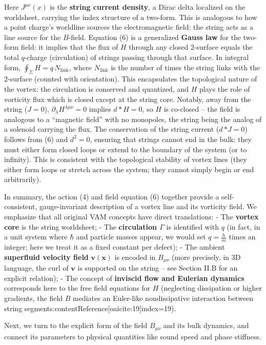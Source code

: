 \documentclass[12pt]{article}
\begin{document}
Here $J^{\mu\nu}(x)$ is the \textbf{string current density}, a Dirac delta localized on the worldsheet, carrying the index structure of a two-form. This is analogous to how a point charge’s worldline sources the electromagnetic field: the string acts as a line source for the $B$-field. Equation (6) is a generalized \textbf{Gauss law} for the two-form field: it implies that the flux of $H$ through any closed 2-surface equals the total $q$-charge (circulation) of strings passing through that surface. In integral form, $\oint_{\Sigma} H = q \,N_{\text{link}}$, where $N_{\text{link}}$ is the number of times the string links with the 2-surface (counted with orientation). This encapsulates the topological nature of the vortex: the circulation is conserved and quantized, and $H$ plays the role of vorticity flux which is closed except at the string core. Notably, away from the string ($J=0$), $\partial_\lambda H^{\lambda\mu\nu}=0$ implies $d*H=0$, so $H$ is co-closed – the field is analogous to a “magnetic field” with no monopoles, the string being the analog of a solenoid carrying the flux. The conservation of the string current ($d\,{*J}=0$) follows from (6) and $d^2=0$, ensuring that strings cannot end in the bulk: they must either form closed loops or extend to the boundary of the system (or to infinity). This is consistent with the topological stability of vortex lines (they either form loops or stretch across the system; they cannot simply begin or end arbitrarily).

In summary, the action (4) and field equation (6) together provide a self-consistent, gauge-invariant description of a vortex line and its vorticity field. We emphasize that all original VAM concepts have direct translations: 
- The \textbf{vortex core} is the string worldsheet;
- The \textbf{circulation $\Gamma$} is identified with $q$ (in fact, in a unit system where $\hbar$ and particle masses appear, we would set $q = \frac{h}{m}$ times an integer; here we treat it as a fixed constant per defect);
- The ambient \textbf{superfluid velocity field} $\mathbf{v}(\mathbf{x})$ is encoded in $B_{\mu\nu}$ (more precisely, in 3D language, the curl of $\mathbf{v}$ is supported on the string – see Section II.B for an explicit relation);
- The concept of \textbf{inviscid flow and Eulerian dynamics} corresponds here to the free field equations for $H$ (neglecting dissipation or higher gradients, the field $B$ mediates an Euler-like nondissipative interaction between string segments:contentReference[oaicite:19]{index=19}).

Next, we turn to the explicit form of the field $B_{\mu\nu}$ and its bulk dynamics, and connect its parameters to physical quantities like sound speed and phase stiffness.
\end{document}
